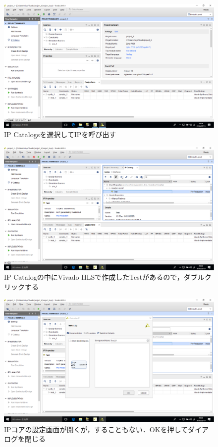 \documentclass[a4paper,dvipdfmx]{jsarticle}
\begin{document}
 \begin{figure}[H]
  \begin{center}
   \includegraphics[width=.8\textwidth]{chapter08_figures/VirtualBox_Windows10_19_03_2018_23_26_09.png}
  \end{center}
  \caption{IP Catalogsを選択してIPを呼び出す}
 \end{figure}

 \begin{figure}[H]
  \begin{center}
   \includegraphics[width=.8\textwidth]{chapter08_figures/VirtualBox_Windows10_19_03_2018_23_26_21.png}
  \end{center}
  \caption{IP Catalogの中にVivado HLSで作成したTestがあるので，ダブルクリックする}
 \end{figure}

 \begin{figure}[H]
  \begin{center}
   \includegraphics[width=.8\textwidth]{chapter08_figures/VirtualBox_Windows10_19_03_2018_23_26_31.png}
  \end{center}
  \caption{IPコアの設定画面が開くが，することもない．OKを押してダイアログを閉じる}
 \end{figure}
\end{document}
